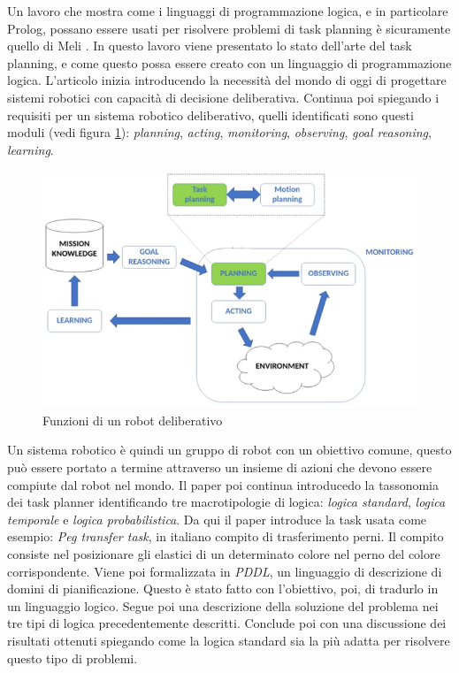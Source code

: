 Un lavoro che mostra come i linguaggi di programmazione logica, e in particolare Prolog, possano essere usati per risolvere problemi di task planning è sicuramente quello di Meli \cite{meli2023logic}. In questo lavoro viene presentato lo stato dell'arte del task planning, e come questo possa essere creato con un linguaggio di programmazione logica.
L'articolo inizia introducendo la necessità del mondo di oggi di progettare sistemi robotici con capacità di decisione deliberativa. 
Continua poi spiegando i requisiti per un sistema robotico deliberativo, quelli identificati sono questi moduli (vedi figura \ref{fig:delrob}): 
    \textit{planning},
    \textit{acting},
    \textit{monitoring},
    \textit{observing},
    \textit{goal reasoning},
    \textit{learning}.
\begin{figure}[h!]
    \centering
    \includegraphics[scale=0.55]{images/deliberativerobot.png}
    \caption{Funzioni di un robot deliberativo \cite{meli2023logic}}
    \label{fig:delrob}
\end{figure}
Un sistema robotico è quindi un gruppo di robot con un obiettivo comune, questo può essere portato a termine attraverso un insieme di azioni che devono essere compiute dal robot nel mondo.
Il paper poi continua introducedo la tassonomia dei task planner identificando tre macrotipologie di logica: \textit{logica standard}, \textit{logica temporale} e \textit{logica probabilistica}.
Da qui il paper introduce la task usata come esempio: \textit{Peg transfer task}, in italiano compito di trasferimento perni.
Il compito consiste nel posizionare gli elastici di un determinato colore nel perno del colore corrispondente.
Viene poi formalizzata in \textit{PDDL}, un linguaggio di descrizione di domini di pianificazione. Questo è stato fatto con l'obiettivo, poi, di tradurlo in un linguaggio logico.
Segue poi una descrizione della soluzione del problema nei tre tipi di logica precedentemente descritti. Conclude poi con una discussione dei risultati ottenuti spiegando come la logica standard sia la più adatta per risolvere questo tipo di problemi.

